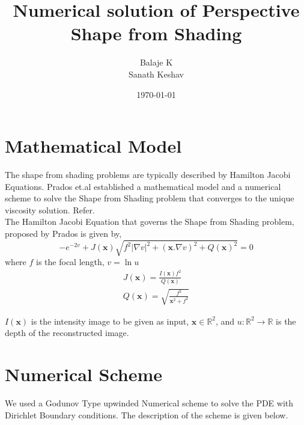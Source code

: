 \documentclass{article}[11pt]
\begin{document}
\title{Numerical solution of Perspective Shape from Shading}
\author{Balaje K \\ Sanath Keshav}
\date{\today}

\maketitle

\section{Mathematical Model}
The shape from shading problems are typically described by Hamilton
Jacobi Equations. Prados et.al established a mathematical model and a
numerical scheme to solve the Shape from Shading problem that
converges to the unique viscosity solution. Refer\cite{prados}. \\

\noindent
The Hamilton Jacobi Equation that governs the Shape from Shading
problem, proposed by Prados\cite{prados} is given by,
\begin{equation}
  -e^{-2v} + J(\mathbf{x})\sqrt{f^2\lvert \nabla v \rvert^2 +
    (\mathbf{x}.\nabla v)^2 + Q(\mathbf{x})^2} = 0 \label{eq:1}
\end{equation}
where $f$ is the focal length, $v = \ln u$
\begin{eqnarray}
J(\mathbf{x}) =
  \frac{I(\mathbf{x})f^2}{Q(\mathbf{x})}\\
  Q(\mathbf{x}) =
  \sqrt{\frac{f^2}{\mathbf{x}^2+f^2}}
\end{eqnarray}

\noindent
$I(\mathbf{x})$ is the intensity image to be given as input,
$\mathbf{x} \in \mathbb{R}^2$, and $u:\mathbb{R}^2\to\mathbb{R}$ is the
depth of the reconstructed image.

\section{Numerical Scheme}
We used a Godunov Type upwinded Numerical scheme to solve the PDE with
Dirichlet Boundary conditions. The description of the scheme is given
below.\\
\end{document}
